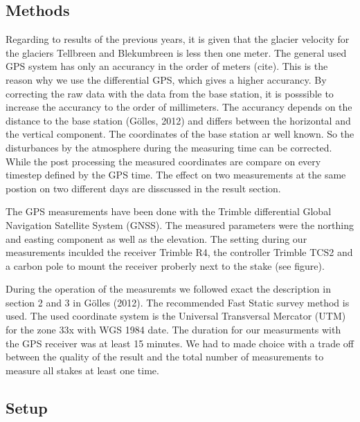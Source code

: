 
\subsection{Methods}

Regarding to results of the previous years, it is given that the glacier velocity for the glaciers Tellbreen and Blekumbreen is less then one meter.
The general used GPS system has only an accurancy in the order of meters (cite).
This is the reason why we use the differential GPS, which gives a higher accurancy.
By correcting the raw data with the data from the base station, it is posssible to increase the accurancy to the order of millimeters.
The accurancy depends on the distance to the base station (Gölles, 2012) and differs between the horizontal and the vertical component.
The coordinates of the base station ar well known. 
So the disturbances by the atmosphere during the measuring time can be corrected. 
While the post processing the measured coordinates are compare on every timestep defined by the GPS time.
The effect on two measurements at the same postion on two different days are disscussed in the result section.\medskip

The GPS measurements have been done with the Trimble differential Global Navigation Satellite System (GNSS). 
The measured parameters were the northing and easting component as well as the elevation.
The setting during our measurements inculded the receiver Trimble R4, the controller Trimble TCS2 and a carbon pole to mount the receiver proberly next to the stake (see figure).\medskip

During the operation of the measuremts we followed exact the description in section 2 and 3 in Gölles (2012). 
The recommended Fast Static survey method is used.
The used coordinate system is the Universal Transversal Mercator (UTM) for the zone 33x with WGS 1984 date. 
The duration for our measurments with the GPS receiver was at least 15 minutes. 
We had to made choice with a trade off between the quality of the result and the total number of measurements to measure all stakes at least one time. 


\subsection{Setup}

